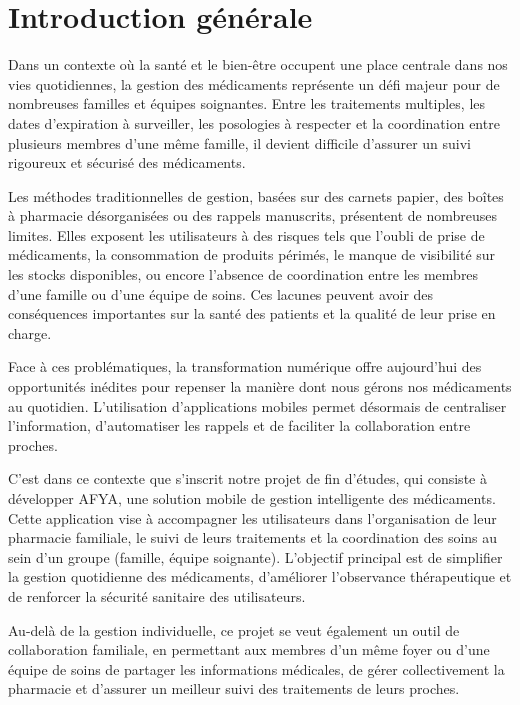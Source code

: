 \chapter*{Introduction générale}
Dans un contexte où la santé et le bien-être occupent une place centrale dans nos vies quotidiennes, la gestion des médicaments représente un défi majeur pour de nombreuses familles et équipes soignantes. Entre les traitements multiples, les dates d'expiration à surveiller, les posologies à respecter et la coordination entre plusieurs membres d'une même famille, il devient difficile d'assurer un suivi rigoureux et sécurisé des médicaments.

Les méthodes traditionnelles de gestion, basées sur des carnets papier, des boîtes à pharmacie désorganisées ou des rappels manuscrits, présentent de nombreuses limites. Elles exposent les utilisateurs à des risques tels que l'oubli de prise de médicaments, la consommation de produits périmés, le manque de visibilité sur les stocks disponibles, ou encore l'absence de coordination entre les membres d'une famille ou d'une équipe de soins. Ces lacunes peuvent avoir des conséquences importantes sur la santé des patients et la qualité de leur prise en charge.

Face à ces problématiques, la transformation numérique offre aujourd'hui des opportunités inédites pour repenser la manière dont nous gérons nos médicaments au quotidien. L'utilisation d'applications mobiles permet désormais de centraliser l'information, d'automatiser les rappels et de faciliter la collaboration entre proches.

C'est dans ce contexte que s'inscrit notre projet de fin d'études, qui consiste à développer AFYA, une solution mobile de gestion intelligente des médicaments. Cette application vise à accompagner les utilisateurs dans l'organisation de leur pharmacie familiale, le suivi de leurs traitements et la coordination des soins au sein d'un groupe (famille, équipe soignante). L'objectif principal est de simplifier la gestion quotidienne des médicaments, d'améliorer l'observance thérapeutique et de renforcer la sécurité sanitaire des utilisateurs.

Au-delà de la gestion individuelle, ce projet se veut également un outil de collaboration familiale, en permettant aux membres d'un même foyer ou d'une équipe de soins de partager les informations médicales, de gérer collectivement la pharmacie et d'assurer un meilleur suivi des traitements de leurs proches.  

